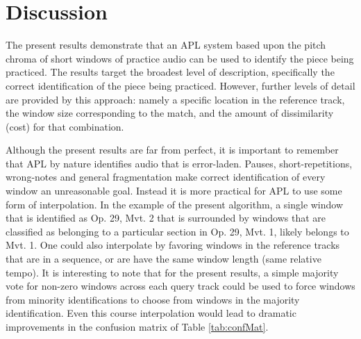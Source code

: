 \documentclass{article}
\begin{document}
\section{Discussion}

The present results demonstrate that an APL system based upon the pitch chroma of short windows of practice audio can be used to identify the piece being practiced. The results target the broadest level of description, specifically the correct identification of the piece being practiced. However, further levels of detail are provided by this approach: namely a specific location in the reference track, the window size corresponding to the match, and the amount of dissimilarity (cost) for that combination. 

Although the present results are far from perfect, it is important to remember that APL by nature identifies audio that is error-laden. Pauses, short-repetitions, wrong-notes and general fragmentation make correct identification of every window an unreasonable goal. Instead it is more practical for APL to use some form of interpolation. In the example of the present algorithm, a single window that is identified as Op. 29, Mvt. 2 that is surrounded by windows that are classified as belonging to a particular section in Op. 29, Mvt. 1, likely belongs to Mvt. 1. One could also interpolate by favoring windows in the reference tracks that are in a sequence, or are have the same window length (same relative tempo). It is interesting to note that for the present results, a simple majority vote for non-zero windows across each query track could be used to force windows from minority identifications to choose from windows in the majority identification. Even this course interpolation would lead to dramatic improvements in the confusion matrix of Table \ref{tab:confMat}. 

\end{document}
